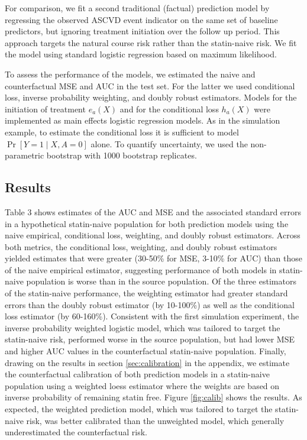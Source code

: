 For comparison, we fit a second traditional (factual) prediction model by regressing the observed ASCVD event indicator on the same set of baseline predictors, but ignoring treatment initiation over the follow up period. This approach targets the natural course risk rather than the statin-naive risk. We fit the model using standard logistic regression based on maximum likelihood.

To assess the performance of the models, we estimated the naive and counterfactual MSE and AUC in the test set. For the latter we used conditional loss, inverse probability weighting, and doubly robust estimators. Models for the initiation of treatment $e_a(X)$ and for the conditional loss $h_a(X)$ were implemented as main effects logistic regression models. As in the simulation example, to estimate the conditional loss it is sufficient to model $\operatorname{Pr}[Y=1 \mid X, A=0]$ alone. To quantify uncertainty, we used the non-parametric bootstrap with 1000 bootstrap replicates.

\subsection{Results}

Table 3 shows estimates of the AUC and MSE and the associated standard errors in a hypothetical statin-naive population for both prediction models using the naive empirical, conditional loss, weighting, and doubly robust estimators. Across both metrics, the conditional loss, weighting, and doubly robust estimators yielded estimates that were greater (30-50\% for MSE, 3-10\% for AUC) than those of the naive empirical estimator, suggesting performance of both models in statin-naive population is worse than in the source population. Of the three estimators of the statin-naive performance, the weighting estimator had greater standard errors than the doubly robust estimator (by 10-100\%) as well as the conditional loss estimator (by 60-160\%). Consistent with the first simulation experiment, the inverse probability weighted logistic model, which was tailored to target the statin-naive risk, performed worse in the source population, but had lower MSE and higher AUC values in the counterfactual statin-naive population. Finally, drawing on the results in section \ref{sec:calibration} in the appendix, we estimate the counterfactual calibration of both prediction models in a statin-naive population using a weighted loess estimator where the weights are based on inverse probability of remaining statin free. Figure \ref{fig:calib} shows the results. As expected, the weighted prediction model, which was tailored to target the statin-naive risk, was better calibrated than the unweighted model, which generally underestimated the counterfactual risk.


